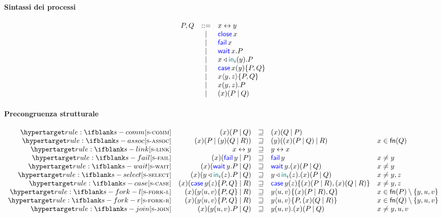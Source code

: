 \documentclass[a4paper]{article}
\title{\Calculus}
\date{}
\begin{document}
\maketitle

\paragraph{Sintassi dei processi}

\[
    \begin{array}{rcll}
        P, Q & ::= & x\leftrightarrow y \\
            & | & \mathsf{\color{blue}close}\,x \\
            & | & \mathsf{\color{blue}fail}\,x \\
            & | & \mathsf{\color{blue}wait}\,x.P \\
            & | & x \triangleleft \mathsf{\color{teal}in}_i(y).P \\
            & | & \mathsf{\color{blue}case}\,x(y)\{P,Q\} \\
            & | & x\langle y,z\rangle\{P,Q\} \\
            & | & x(y,z).P \\
            & | & (x)(P\mathbin| Q) \\
    \end{array}
\]

\paragraph{Precongruenza strutturale}

\[
    \begin{array}{rrcll}
        \defrule{s-comm} &
        \Cut\x{P}{Q} & \pcong & \Cut\x{Q}{P} \\
        \defrule{s-assoc} &
        \Cut\x{P}{\Cut\y{Q}{R}} & \pcong & \Cut\y{\Cut\x{P}{Q}}{R} & x\in\fn{Q} \\
        \defrule{s-link} &
        \Link\x\y & \pcong & \Link\y\x \\
        \defrule{s-fail} &
        \Cut\x{\Fail\y}{P} & \pcong & \Fail\y & x \ne y \\
        \defrule{s-wait} &
        \Cut\x{\Wait\y.P}{Q} & \pcong & \Wait\y.\Cut\x{P}{Q} & x \ne y \\
        \defrule{s-select} &
        \Cut\x{\Select\y{\InTag_i}\z.P}{Q} & \pcong & \Select\y{\InTag_i}\z.\Cut\x{P}{Q} & x \ne y,z \\
        \defrule{s-case} &
        \Cut\x{\Case\y\z{P}{Q}}{R} & \pcong & \Case\y\z{\Cut\x{P}{R}}{\Cut\x{Q}{R}} & x \ne y,z \\
        \defrule{s-fork-l} &
        \Cut\x{\Fork\y\u\v{P}{Q}}{R} & \pcong & \Fork\y\u\v{\Cut\x{P}{R}}{Q} & x \in \fn{P}\setminus\set{y,u,v} \\
        \defrule{s-fork-r} &
        \Cut\x{\Fork\y\u\v{P}{Q}}{R} & \pcong & \Fork\y\u\v{P}{\Cut\x{Q}{R}} & x \in \fn{Q}\setminus\set{y,u,v} \\
        \defrule{s-join} &
        \Cut\x{\Join\y\u\v.P}{Q} & \pcong & \Join\y\u\v.\Cut\x{P}{Q} & x \ne y,u,v \\
    \end{array}
\]
\end{document}
